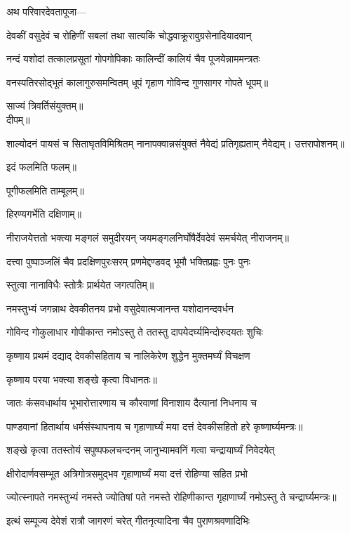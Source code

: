 अथ परिवारदेवतापूजा—

\twolineshloka
{देवकीं वसुदेवं च रोहिणीं सबलां तथा}
{सात्यकिं चोद्धवाक्रूरावुग्रसेनादियादवान्}

\twolineshloka
{नन्दं यशोदां तत्कालप्रसूतां गोपगोपिकाः}
{कालिन्दीं कालियं चैव पूजयेन्नाममन्त्रतः}

\twolineshloka
{वनस्पतिरसोद्भूतं कालागुरुसमन्वितम्}
{धूपं गृहाण गोविन्द गुणसागर गोपते}
धूपम्॥

साज्यं त्रिवर्तिसंयुक्तम्॥\\
दीपम्॥

\twolineshloka
{शाल्योदनं पायसं च सिताघृतविमिश्रितम्}
{नानापक्वान्नसंयुक्तं नैवेद्यं प्रतिगृह्यताम्}
नैवेद्यम्।
उत्तरापोशनम्॥

इदं फलमिति फलम्॥

पूगीफलमिति ताम्बूलम्॥

हिरण्यगर्भेति दक्षिणाम्॥

\twolineshloka
{नीराजयेत्ततो भक्त्या मङ्गलं समुदीरयन्}
{जयमङ्गलनिर्घोषैर्देवदेवं समर्चयेत्}
नीराजनम्॥


\twolineshloka
{दत्त्वा पुष्पाञ्जलिं चैव प्रदक्षिणपुरःसरम्}
{प्रणमेद्दण्डवद् भूमौ भक्तिप्रह्वः पुनः पुनः}

स्तुत्वा नानाविधैः स्तोत्रैः प्रार्थयेत जगत्पतिम्॥

\twolineshloka
{नमस्तुभ्यं जगन्नाथ देवकीतनय प्रभो}
{वसुदेवात्मजानन्त यशोदानन्दवर्धन}

\twolineshloka
{गोविन्द गोकुलाधार गोपीकान्त नमोऽस्तु ते}
{ततस्तु दापयेदर्घ्यमिन्दोरुदयतः शुचिः}

\twolineshloka
{कृष्णाय प्रथमं दद्याद् देवकीसहिताय च}
{नालिकेरेण शुद्धेन मुक्तमर्घ्यं विचक्षण}

कृष्णाय परया भक्त्या शङ्खे कृत्वा विधानतः॥

\twolineshloka
{जातः कंसवधार्थाय भूभारोत्तारणाय च}
{कौरवाणां विनाशाय दैत्यानां निधनाय च}

\twolineshloka
{पाण्डवानां हितार्थाय धर्मसंस्थापनाय च}
{गृहाणार्घ्यं मया दत्तं देवकीसहितो हरे}
कृष्णार्घ्यमन्त्रः॥

\twolineshloka
{शङ्खे कृत्वा ततस्तोयं सपुष्पफलचन्दनम्}
{जानुभ्यामवनिं गत्वा चन्द्रायार्घ्यं निवेदयेत्}

\twolineshloka
{क्षीरोदार्णवसम्भूत अत्रिगोत्रसमुद्भव}
{गृहाणार्घ्यं मया दत्तं रोहिण्या सहित प्रभो}

\twolineshloka
{ज्योत्स्नापते नमस्तुभ्यं नमस्ते ज्योतिषां पते}
{नमस्ते रोहिणीकान्त गृहाणार्घ्यं नमोऽस्तु ते}
चन्द्रार्घ्यमन्त्रः॥

\twolineshloka
{इत्थं सम्पूज्य देवेशं रात्रौ जागरणं चरेत्}
{गीतनृत्यादिना चैव पुराणश्रवणादिभिः}

